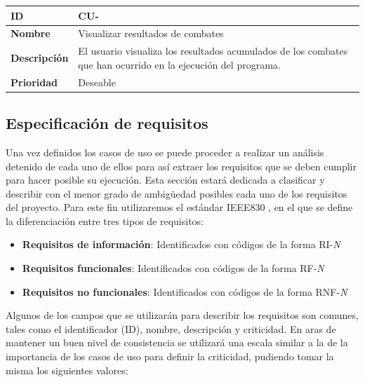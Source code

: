 \begin{center}
	\begin{tabular}{ | p{3cm} | p{10cm} | } 
		\hline
		
		\textbf{ID} & CU-\arabic{contador_casos_de_uso}
		{contador_casos_de_uso} \\
		
		\hline 
		
		\textbf{Nombre} &
		Visualizar resultados de combates\\ 
		
		\hline
		
		\textbf{Descripción} & 
		El usuario visualiza los resultados acumulados de los combates que han ocurrido en la ejecución del programa.\\
		
		\hline 
		
		\textbf{Prioridad} &
		Deseable\\
		
		\hline
	\end{tabular}
\end{center}


\subsection{Especificación de requisitos}

Una vez definidos los casos de uso se puede proceder a realizar un análisis detenido de cada uno de ellos para así extraer los requisitos que se deben cumplir para hacer posible su ejecución. Esta sección estará dedicada a clasificar y describir con el menor grado de ambigüedad posibles cada uno de los requisitos del proyecto. Para este fin utilizaremos el estándar IEEE830 \cite{ieee}, en el que se define la diferenciación entre tres tipos de requisitos:

\begin{itemize}
\item \textbf{Requisitos de información}: Identificados con códigos de la forma RI-\textit{N}
\item \textbf{Requisitos funcionales}: Identificados con códigos de la forma RF-\textit{N}
\item \textbf{Requisitos no funcionales}: Identificados con códigos de la forma RNF-\textit{N}
\end{itemize}

Algunos de los campos que se utilizarán para describir los requisitos son comunes, tales como el identificador (ID), nombre, descripción y criticidad. En aras de mantener un buen nivel de consistencia se utilizará una escala similar a la de la importancia de los casos de uso para definir la criticidad, pudiendo tomar la misma los siguientes valores:

